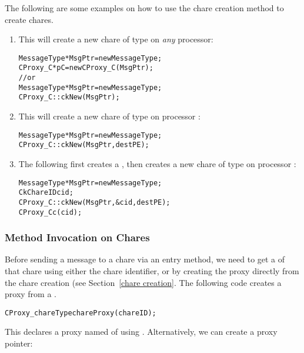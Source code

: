 The following are some examples on how to use the chare creation
method to create chares.

\begin{enumerate}
\item{This will create a new chare of type  on {\em any}
processor:}

\begin{alltt}
   MessageType *MsgPtr = new MessageType;
   CProxy_C *pC = new CProxy_C(MsgPtr);
      // or
   MessageType *MsgPtr = new MessageType;
   CProxy_C::ckNew(MsgPtr);
\end{alltt} 

\item{This will create a new chare of type  on processor
:}

\begin{alltt}
   MessageType *MsgPtr = new MessageType;
   CProxy_C::ckNew(MsgPtr, destPE);
\end{alltt}

\item{The following first creates a  ,
then creates a new chare of type  on processor :}

\begin{alltt}
   MessageType *MsgPtr = new MessageType;
   CkChareID cid;
   CProxy_C::ckNew(MsgPtr, \&cid, destPE);
   CProxy_C c(cid);
\end{alltt}

\end{enumerate}

\subsubsection{Method Invocation on Chares}

Before sending a message to a chare via an
entry method, we need to get a  of
that chare using either the chare identifier, or by creating the
proxy directly from the chare creation (see Section~\ref{chare
creation}. The following code creates a proxy from a .

\begin{alltt}
   CProxy_chareType chareProxy(chareID);
\end{alltt}

This declares a proxy named  of  
using .  Alternatively, we can create a proxy pointer:

